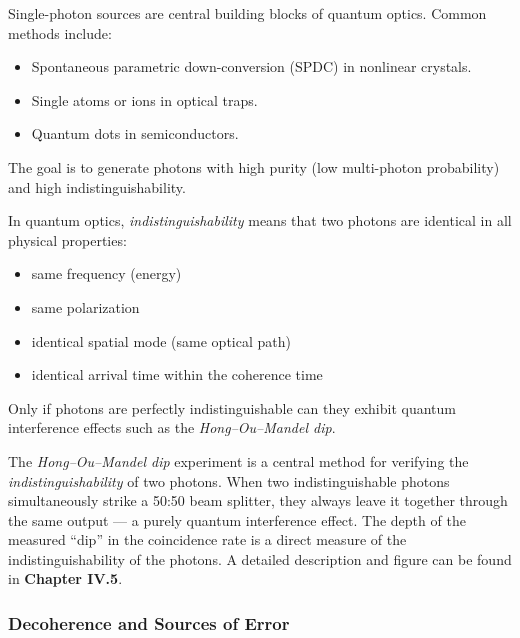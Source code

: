Single-photon sources are central building blocks of quantum optics. Common methods include:
\begin{itemize}
	\item Spontaneous parametric down-conversion (SPDC) in nonlinear crystals.
	\item Single atoms or ions in optical traps.
	\item Quantum dots in semiconductors.
\end{itemize}
The goal is to generate photons with high purity (low multi-photon probability) and high indistinguishability.
\newpage
\noindent
\vspace{1em}
\begin{tcolorbox}[hinweisbox, title=What Does “Indistinguishability” Mean? \label{box:indistinguishability}]
	\small
	In quantum optics, \emph{indistinguishability} means that two photons are identical in all physical properties:
	\begin{itemize}
		\item same frequency (energy)
		\item same polarization
		\item identical spatial mode (same optical path)
		\item identical arrival time within the coherence time
	\end{itemize}
	Only if photons are perfectly indistinguishable can they exhibit quantum interference effects such as the \emph{Hong–Ou–Mandel dip}.
\end{tcolorbox}
\vspace{1em}
\begin{tcolorbox}[physikbox, title=The Hong–Ou–Mandel Dip Phenomenon \label{box:hong_ou_mandel}]
	\small
	The \emph{Hong–Ou–Mandel dip} experiment is a central method for verifying the \emph{indistinguishability} of two photons. When two indistinguishable photons simultaneously strike a 50:50 beam splitter, they always leave it together through the same output — a purely quantum interference effect.  
	The depth of the measured “dip” in the coincidence rate is a direct measure of the indistinguishability of the photons.  
	A detailed description and figure can be found in \textbf{Chapter IV.5}.
\end{tcolorbox}

\subsubsection{Decoherence and Sources of Error}

